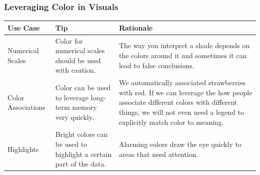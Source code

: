 \documentclass[]{book}
\theoremstyle{definition}
\theoremstyle{definition}
\theoremstyle{definition}
\theoremstyle{remark}
\begin{document}
\subsubsection{Leveraging Color in
Visuals}\label{leveraging-color-in-visuals}

\begin{longtable}[]{@{}lll@{}}
\toprule
\begin{minipage}[b]{0.10\columnwidth}\raggedright\strut
Use Case\strut
\end{minipage} & \begin{minipage}[b]{0.29\columnwidth}\raggedright\strut
Tip\strut
\end{minipage} & \begin{minipage}[b]{0.39\columnwidth}\raggedright\strut
Rationale\strut
\end{minipage}\tabularnewline
\midrule
\endhead
\begin{minipage}[t]{0.10\columnwidth}\raggedright\strut
Numerical Scales\strut
\end{minipage} & \begin{minipage}[t]{0.29\columnwidth}\raggedright\strut
Color for numerical scales should be used with caution.\strut
\end{minipage} & \begin{minipage}[t]{0.39\columnwidth}\raggedright\strut
The way you interpret a shade depends on the colors around it and
sometimes it can lead to false conclusions.\strut
\end{minipage}\tabularnewline
\begin{minipage}[t]{0.10\columnwidth}\raggedright\strut
Color Associations\strut
\end{minipage} & \begin{minipage}[t]{0.29\columnwidth}\raggedright\strut
Color can be used to leverage long-term memory very quickly.\strut
\end{minipage} & \begin{minipage}[t]{0.39\columnwidth}\raggedright\strut
We automatically associated strawberries with red. If we can leverage
the how people associate different colors with different things, we will
not even need a legend to explicitly match color to meaning.\strut
\end{minipage}\tabularnewline
\begin{minipage}[t]{0.10\columnwidth}\raggedright\strut
Highlights\strut
\end{minipage} & \begin{minipage}[t]{0.29\columnwidth}\raggedright\strut
Bright colors can be used to highlight a certain part of the data.\strut
\end{minipage} & \begin{minipage}[t]{0.39\columnwidth}\raggedright\strut
Alarming colors draw the eye quickly to areas that need attention.\strut
\end{minipage}\tabularnewline
\bottomrule
\end{longtable}
\end{document}
